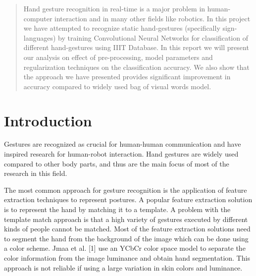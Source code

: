 \documentclass[conference]{IEEEtran}
\begin{document}
\begin{abstract}
Hand gesture recognition in real-time is a major problem in human-computer interaction and in many other fields like robotics. In this project we have attempted to recognize static hand-gestures (specifically sign-languages) by training Convolutional Neural Networks for classification of different hand-gestures using IIIT Database. In this report we will present our analysis on effect of pre-processing, model parameters and regularization techniques on the classification accuracy. We also show that the approach we have presented provides significant improvement in accuracy compared to widely used bag of visual words model.
\end{abstract}





%
\IEEEpeerreviewmaketitle



\section{Introduction}
Gestures are recognized as crucial for human-human communication and have inspired research for human-robot interaction. Hand gestures are widely used compared to other body parts, and thus are the main focus of most of the research in this field.

The most common approach for gesture recognition is the application of feature extraction techniques to represent postures. A popular feature extraction solution is to represent the hand by matching it to a template. A problem with the template match approach is that a high variety of gestures executed by different kinds of people cannot be matched. Most of the feature extraction solutions need to segment the hand from the background of the image which can be done using a color scheme. Jmaa et al. [1] use an YCbCr color space model to separate the color information from the image luminance and obtain hand segmentation. This approach is not reliable if using a large variation in skin colors and luminance.
\end{document}
